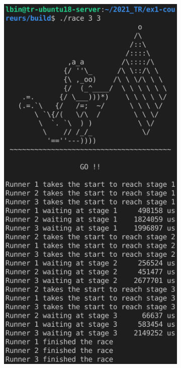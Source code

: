 \documentclass{article}
\begin{document}
\begin{figure}[H]
\begin{subfigure}[b]{.48\textwidth}
        \end{subfigure}
        \begin{subfigure}[b]{.48\textwidth}
            \centering
            \includegraphics[width=.9\textwidth]{./screenshots/race332.png}
        \end{subfigure}
    \end{figure}
\end{document}
